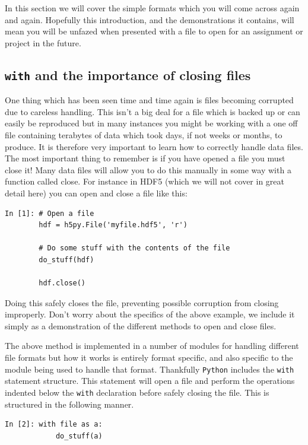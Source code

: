 In this section we will cover the simple formats which you will come across again and again. Hopefully this introduction, and the demonstrations it contains, will mean you will be unfazed when presented with a file to open for an assignment or project in the future.

\subsection{\texttt{with} and the importance of closing files}

One thing which has been seen time and time again is files becoming corrupted due to careless handling. This isn't a big deal for a file which is backed up or can easily be reproduced but in many instances you might be working with a one off file containing terabytes of data which took days, if not weeks or months, to produce. It is therefore very important to learn how to correctly handle data files. The most important thing to remember is if you have opened a file you must close it! Many data files will allow you to do this manually in some way with a function called close. For instance in HDF5 (which we will not cover in great detail here) you can open and close a file like this:

\begin{lstlisting}[style=PY]
In [1]: # Open a file
        hdf = h5py.File('myfile.hdf5', 'r')
        
        # Do some stuff with the contents of the file
        do_stuff(hdf)
        
        hdf.close()
\end{lstlisting}

Doing this safely closes the file, preventing possible corruption from closing improperly. Don't worry about the specifics of the above example, we include it simply as a demonstration of the different methods to open and close files.

The above method is implemented in a number of modules for handling different file formats but how it works is entirely format specific, and also specific to the module being used to handle that format. Thankfully \texttt{Python} includes the \texttt{with} statement structure. This statement will open a file and perform the operations indented below the \texttt{with} declaration before safely closing the file. This is structured in the following manner.

\begin{lstlisting}[style=PY]
In [2]: with file as a:
            do_stuff(a)
\end{lstlisting}

